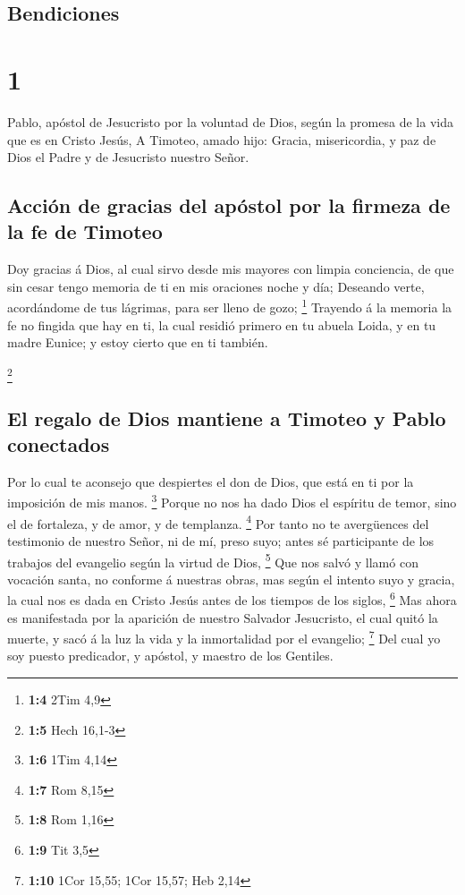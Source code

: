 \hypertarget{bendiciones}{%
\subsection{Bendiciones}\label{bendiciones}}

\hypertarget{section}{%
\section{1}\label{section}}

 Pablo, apóstol de Jesucristo por la voluntad de Dios,
según la promesa de la vida que es en Cristo Jesús,  A
Timoteo, amado hijo: Gracia, misericordia, y paz de Dios el Padre y de
Jesucristo nuestro Señor.

\hypertarget{acciuxf3n-de-gracias-del-apuxf3stol-por-la-firmeza-de-la-fe-de-timoteo}{%
\subsection{Acción de gracias del apóstol por la firmeza de la fe de
Timoteo}\label{acciuxf3n-de-gracias-del-apuxf3stol-por-la-firmeza-de-la-fe-de-timoteo}}

 Doy gracias á Dios, al cual sirvo desde mis mayores con
limpia conciencia, de que sin cesar tengo memoria de ti en mis oraciones
noche y día;  Deseando verte, acordándome de tus lágrimas,
para ser lleno de gozo; \footnote{\textbf{1:4} 2Tim 4,9} 
Trayendo á la memoria la fe no fingida que hay en ti, la cual residió
primero en tu abuela Loida, y en tu madre Eunice; y estoy cierto que en
ti también.

\footnote{\textbf{1:5} Hech 16,1-3}

\hypertarget{el-regalo-de-dios-mantiene-a-timoteo-y-pablo-conectados}{%
\subsection{El regalo de Dios mantiene a Timoteo y Pablo
conectados}\label{el-regalo-de-dios-mantiene-a-timoteo-y-pablo-conectados}}

 Por lo cual te aconsejo que despiertes el don de Dios,
que está en ti por la imposición de mis manos. \footnote{\textbf{1:6}
  1Tim 4,14}  Porque no nos ha dado Dios el espíritu de
temor, sino el de fortaleza, y de amor, y de templanza. \footnote{\textbf{1:7}
  Rom 8,15}  Por tanto no te avergüences del testimonio de
nuestro Señor, ni de mí, preso suyo; antes sé participante de los
trabajos del evangelio según la virtud de Dios, \footnote{\textbf{1:8}
  Rom 1,16}  Que nos salvó y llamó con vocación santa, no
conforme á nuestras obras, mas según el intento suyo y gracia, la cual
nos es dada en Cristo Jesús antes de los tiempos de los siglos,
\footnote{\textbf{1:9} Tit 3,5}  Mas ahora es manifestada
por la aparición de nuestro Salvador Jesucristo, el cual quitó la
muerte, y sacó á la luz la vida y la inmortalidad por el evangelio;
\footnote{\textbf{1:10} 1Cor 15,55; 1Cor 15,57; Heb 2,14}
 Del cual yo soy puesto predicador, y apóstol, y maestro
de los Gentiles.

